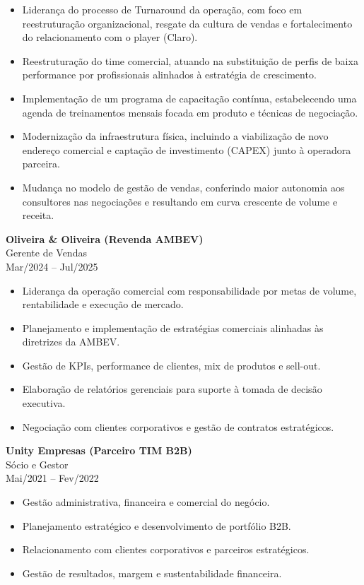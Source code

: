 \documentclass[11pt,a4paper]{article}
\begin{document}
\begin{itemize}
\item Liderança do processo de Turnaround da operação, com foco em reestruturação organizacional, resgate da cultura de vendas e fortalecimento do relacionamento com o player (Claro).
\item Reestruturação do time comercial, atuando na substituição de perfis de baixa performance por profissionais alinhados à estratégia de crescimento.
\item Implementação de um programa de capacitação contínua, estabelecendo uma agenda de treinamentos mensais focada em produto e técnicas de negociação.
\item Modernização da infraestrutura física, incluindo a viabilização de novo endereço comercial e captação de investimento (CAPEX) junto à operadora parceira.
\item Mudança no modelo de gestão de vendas, conferindo maior autonomia aos consultores nas negociações e resultando em curva crescente de volume e receita.
\end{itemize}

\vspace{8pt}

\textbf{Oliveira \& Oliveira (Revenda AMBEV)} \\
Gerente de Vendas \\
Mar/2024 -- Jul/2025

\begin{itemize}
\item Liderança da operação comercial com responsabilidade por metas de volume, rentabilidade e execução de mercado.
\item Planejamento e implementação de estratégias comerciais alinhadas às diretrizes da AMBEV.
\item Gestão de KPIs, performance de clientes, mix de produtos e sell-out.
\item Elaboração de relatórios gerenciais para suporte à tomada de decisão executiva.
\item Negociação com clientes corporativos e gestão de contratos estratégicos.
\end{itemize}

\vspace{8pt}

\textbf{Unity Empresas (Parceiro TIM B2B)} \\
Sócio e Gestor \\
Mai/2021 -- Fev/2022

\begin{itemize}
\item Gestão administrativa, financeira e comercial do negócio.
\item Planejamento estratégico e desenvolvimento de portfólio B2B.
\item Relacionamento com clientes corporativos e parceiros estratégicos.
\item Gestão de resultados, margem e sustentabilidade financeira.
\end{itemize}
\end{document}
